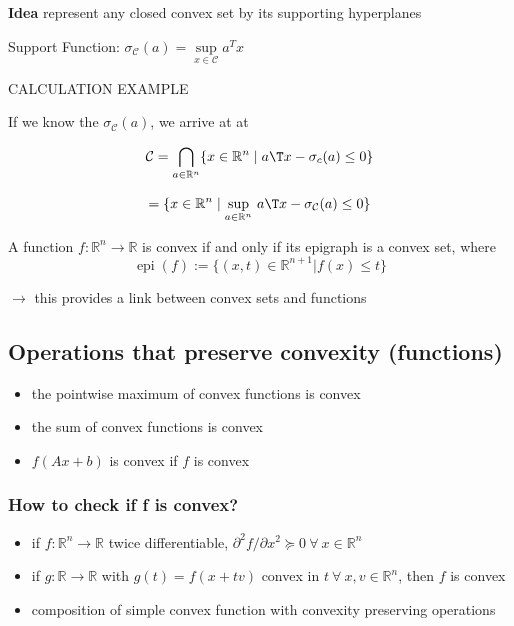\textbf{Idea} represent any closed convex set by its supporting hyperplanes

Support Function: $\sigma_\mathcal{C}(a) = \underset{x \in \mathcal{C}}{\operatorname{sup}}a^Tx$

CALCULATION EXAMPLE

If we know the $\sigma_\mathcal{C}(a)$, we arrive at at

$$  \mathcal{C} = \bigcap_{a \in \mathbb{R}^n} \{x \in \mathbb{R}^n \mid a\T x - \sigma_c(a) \leq 0\}$$

$$   = \{x \in \mathbb{R}^n \mid \underset{a \in \mathbb{R}^{n}}{\operatorname{sup}}\ a\T x - \sigma_\mathcal{C}(a) \le 0\}$$

\begin{definition}
	A function $f : \mathbb{R}^n \rightarrow \mathbb{R}$
	is convex if and only if its epigraph is a convex set, where
	$$\operatorname{epi}(f):=\{(x,t)\in \mathbb{R}^{n+1} | f(x) \le t \}$$
\end{definition}

$\rightarrow$ this provides a link between convex sets and functions

\subsection{Operations that preserve convexity (functions)}

\begin{itemize}
	\item the pointwise maximum of convex functions is convex
	\item the sum of convex functions is convex
	\item $f(Ax+b)$ is convex if $f$ is convex
\end{itemize}

\subsubsection{How to check if f is convex?}

\begin{itemize}
	\item if $f: \mathbb{R}^n \rightarrow \mathbb{R}$ twice differentiable,
	      $\partial^2f/\partial x^2 \succeq 0\ \forall\ x \in \mathbb{R}^{n}$

	\item if $g: \mathbb{R} \rightarrow \mathbb{R}$ with $g(t)=f(x+tv)$
	      convex in $t\ \forall\ x,v \in \mathbb{R}^{n}$,
	      then $f$ is convex
	\item composition of simple convex function with convexity preserving operations
\end{itemize}

